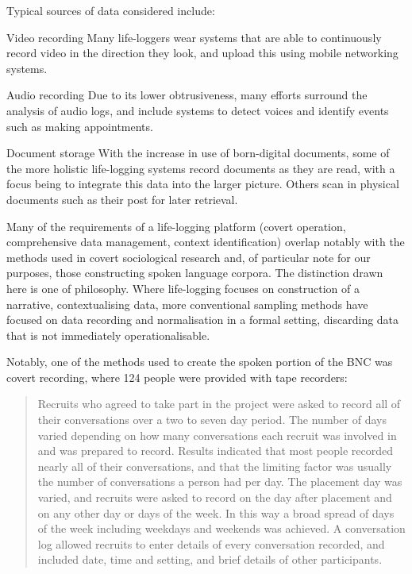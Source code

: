 Typical sources of data considered include:

\begin{itemizeTitle}
    \item[Video recording] Many life-loggers wear systems that are able to continuously record video in the direction they look, and upload this using mobile networking systems.
    \item[Audio recording] Due to its lower obtrusiveness, many efforts surround the analysis of audio logs, and include systems to detect voices and identify events such as making appointments.
    \item[Document storage] With the increase in use of born-digital documents, some of the more holistic life-logging systems record documents as they are read, with a focus being to integrate this data into the larger picture.  Others scan in physical documents such as their post for later retrieval.
\end{itemizeTitle}

Many of the requirements of a life-logging platform (covert operation, comprehensive data management, context identification) overlap notably with the methods used in covert sociological research and, of particular note for our purposes, those constructing spoken language corpora.  The distinction drawn here is one of philosophy.  Where life-logging focuses on construction of a narrative, contextualising data, more conventional sampling methods have focused on data recording and normalisation in a formal setting, discarding data that is not immediately operationalisable.


Notably, one of the methods used to create the spoken portion of the BNC was covert recording, where 124 people were provided with tape recorders\cite{burnard1995users}:
\begin{quote}
Recruits who agreed to take part in the project were asked to record all of their conversations over a two to seven day period. The number of days varied depending on how many conversations each recruit was involved in and was prepared to record. Results indicated that most people recorded nearly all of their conversations, and that the limiting factor was usually the number of conversations a person had per day. The placement day was varied, and recruits were asked to record on the day after placement and on any other day or days of the week. In this way a broad spread of days of the week including weekdays and weekends was achieved. A conversation log allowed recruits to enter details of every conversation recorded, and included date, time and setting, and brief details of other participants.
\end{quote}

